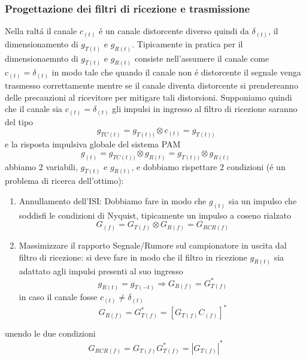         \subsubsection{Progettazione dei filtri di ricezione e trasmissione}
            Nella raltá il canale $c_{(t)}$ é un canale distorcente diverso quindi da $\delta_{(t)}$, il dimensionamento di $g_{T(t)}$
            e $g_{R(t)}$. Tipicamente in pratica per il dimensionaemnto di $g_{T(t)}$ e $g_{R(t)}$ consiste nell'assumere il canale 
            come $c_{(t)} = \delta_{(t)}$ in modo tale che quando il canale non é distorcente il segnale venga trasmesso correttamente
            mentre se il canale diventa distorcente si prendereanno delle precauzioni al ricevitore per mitigare tali distorsioni.
            Supponiamo quindi che il canale sia $c_{(t)} = \delta_{(t)}$ gli impulsi in ingresso al filtro di ricezione saranno del tipo
            \[
                g_{TC(t)} = g_{T(t))} \otimes c_{(t)} =  g_{T(t))} 
            \]
            e la risposta impulsiva globale del sistema PAM
            \[
                g_{(t)} = g_{TC(t))} \otimes g_{R(t)} =  g_{T(t))} \otimes g_{R(t)}
            \]
            abbiamo 2 variabili, $g_{T(t)}$ e $g_{R(t)}$, e dobbiamo rispettare 2 condizioni (é un problema di ricerca dell'ottimo):
            \begin{enumerate}
                \item {
                    Annullamento dell'ISI: Dobbiamo fare in modo che $g_{(t)}$ sia un impulso che soddisfi le condizioni di Nyquist,
                    tipicamente un impulso a coseno rialzato
                    \[
                        G_{(f)} = G_{T(f)} \otimes G_{R(f)} = G_{RCR(f)} 
                    \]
                }
                \item {
                    Massimizzare il rapporto Segnale/Rumore sul campionatore in uscita dal filtro di ricezione:
                    si deve fare in modo che il filtro in ricezione $g_{R(t)}$ sia adattato agli impulsi presenti al suo ingresso
                    \[
                        g_{R(t)} = g_{T(-t)} \Rightarrow G_{R(f)} = G_{T(f)}^\ast
                    \]
                    in caso il canale fosse $c_{(t)} \neq \delta_{(t)}$ 
                    \[
                        G_{R(f)} = G_{T(f)}^\ast = \left[G_{T(f)} C_{(f)}\right]^\ast  
                    \]                
                }
            \end{enumerate}
            unendo le due condizioni 
            \[
                G_{RCR(f)} = G_{T(f)}G_{T(f)}^\ast = \left|G_{T(f)}\right|^\ast  
            \]
